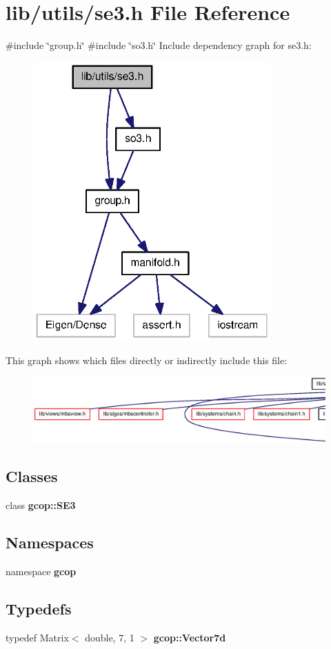 \section{lib/utils/se3.h \-File \-Reference}
\label{se3_8h}
{\ttfamily \#include \char`\"{}group.\-h\char`\"{}}\*
{\ttfamily \#include \char`\"{}so3.\-h\char`\"{}}\*
\-Include dependency graph for se3.\-h\-:\nopagebreak
\begin{figure}[H]
\begin{center}
\leavevmode
\includegraphics[width=258pt]{se3_8h__incl}
\end{center}
\end{figure}
\-This graph shows which files directly or indirectly include this file\-:
\nopagebreak
\begin{figure}[H]
\begin{center}
\leavevmode
\includegraphics[width=350pt]{se3_8h__dep__incl}
\end{center}
\end{figure}
\subsection*{\-Classes}
\begin{DoxyCompactItemize}
\item 
class {\bf gcop\-::\-S\-E3}
\end{DoxyCompactItemize}
\subsection*{\-Namespaces}
\begin{DoxyCompactItemize}
\item 
namespace {\bf gcop}
\end{DoxyCompactItemize}
\subsection*{\-Typedefs}
\begin{DoxyCompactItemize}
\item 
typedef \-Matrix$<$ double, 7, 1 $>$ {\bf gcop\-::\-Vector7d}
\end{DoxyCompactItemize}
